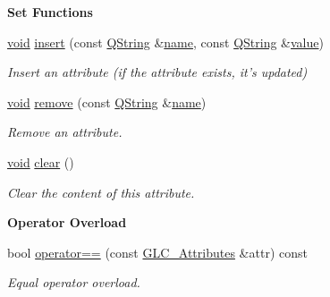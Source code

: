 \begin{Indent}{\bf Set Functions}\par
\begin{DoxyCompactItemize}
\item 
\hyperlink{group___u_a_v_objects_plugin_ga444cf2ff3f0ecbe028adce838d373f5c}{void} \hyperlink{class_g_l_c___attributes_a02eb868f8aec1bf64a2f7f4f2581d9c3}{insert} (const \hyperlink{group___u_a_v_objects_plugin_gab9d252f49c333c94a72f97ce3105a32d}{Q\-String} \&\hyperlink{glext_8h_ad977737dfc9a274a62741b9500c49a32}{name}, const \hyperlink{group___u_a_v_objects_plugin_gab9d252f49c333c94a72f97ce3105a32d}{Q\-String} \&\hyperlink{glext_8h_aa0e2e9cea7f208d28acda0480144beb0}{value})
\begin{DoxyCompactList}\small\item\em Insert an attribute (if the attribute exists, it's updated) \end{DoxyCompactList}\item 
\hyperlink{group___u_a_v_objects_plugin_ga444cf2ff3f0ecbe028adce838d373f5c}{void} \hyperlink{class_g_l_c___attributes_af92355e671c57fb62f3dd5cd0edfaf3b}{remove} (const \hyperlink{group___u_a_v_objects_plugin_gab9d252f49c333c94a72f97ce3105a32d}{Q\-String} \&\hyperlink{glext_8h_ad977737dfc9a274a62741b9500c49a32}{name})
\begin{DoxyCompactList}\small\item\em Remove an attribute. \end{DoxyCompactList}\item 
\hyperlink{group___u_a_v_objects_plugin_ga444cf2ff3f0ecbe028adce838d373f5c}{void} \hyperlink{class_g_l_c___attributes_aa6cd0c2b47d725768061e5ad0904b9e8}{clear} ()
\begin{DoxyCompactList}\small\item\em Clear the content of this attribute. \end{DoxyCompactList}\end{DoxyCompactItemize}
\end{Indent}
\begin{Indent}{\bf Operator Overload}\par
\begin{DoxyCompactItemize}
\item 
bool \hyperlink{class_g_l_c___attributes_a67dcaf5e9789415662ae29b9789af129}{operator==} (const \hyperlink{class_g_l_c___attributes}{G\-L\-C\-\_\-\-Attributes} \&attr) const 
\begin{DoxyCompactList}\small\item\em Equal operator overload. \end{DoxyCompactList}\end{DoxyCompactItemize}
\end{Indent}


